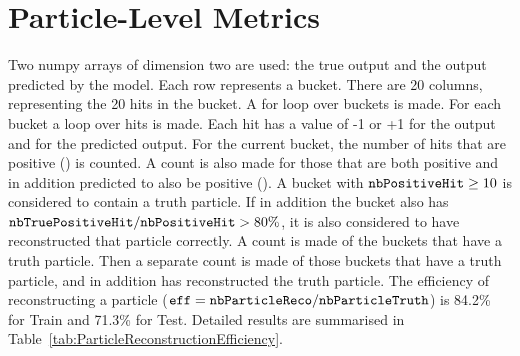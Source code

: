 \section{Particle-Level Metrics}
\label{sec:ParticleLevelMetrics}

Two numpy arrays of dimension two are used: the true output and the output predicted by the model. Each row represents a bucket. There are 20 columns, representing the 20 hits in the bucket. A for loop over buckets is made. For each bucket a loop over hits is made. Each hit has a value of -1 or +1 for the output and for the predicted output. For the current bucket, the number of hits that are positive (\nbPositiveHit) is counted. A count is also made for those that are both positive and in addition predicted to also be positive (\nbTruePositiveHit). A bucket with $\nbPositiveHit \ge 10$ is considered to contain a truth particle. If in addition the bucket also has $\nbTruePositiveHit /\nbPositiveHit > 80\%$, it is also considered to have reconstructed that particle correctly. A count is made of the buckets that have a truth particle. Then a separate count is made of those buckets that have a truth particle, and in addition has reconstructed the truth particle. The efficiency of reconstructing a particle ($\eff = \nbParticleReco / \nbParticleTruth$) is 84.2\% for Train and 71.3\% for Test. Detailed results are summarised in Table~\ref{tab:ParticleReconstructionEfficiency}.

\begin{table}[h!]
\centering
\caption {Particle reconstruction efficiency results}
\label{tab:ParticleReconstructionEfficiency}
\end{table}
